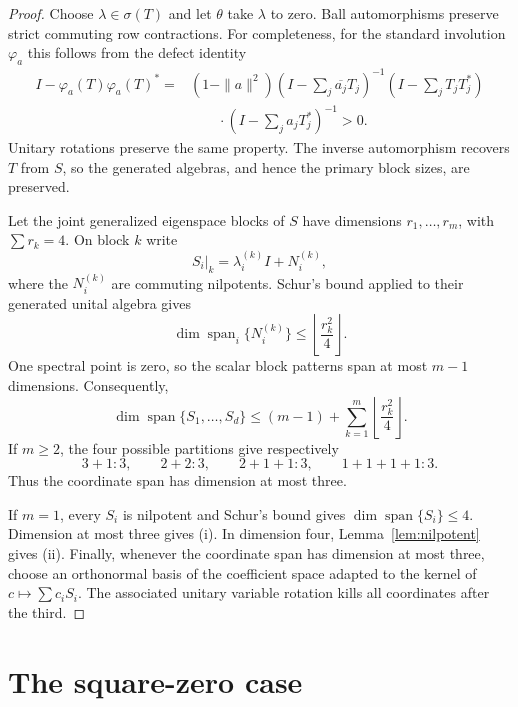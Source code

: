 \documentclass[11pt]{article}
\theoremstyle{remark}
\newcommand{\Span}{\operatorname{span}}
\begin{document}
\begin{proof}
Choose $\lambda\in\sigma(T)$ and let $\theta$ take $\lambda$ to zero.  Ball
automorphisms preserve strict commuting row contractions.  For completeness,
for the standard involution $\varphi_a$ this follows from the defect identity
\begin{equation}\label{eq:defect}
\begin{aligned}
 I-\varphi_a(T)\varphi_a(T)^*
  ={}&(1-\|a\|^2)
  \left(I-\sum_j\overline{a_j}T_j\right)^{-1}
  \left(I-\sum_jT_jT_j^*\right)\\
  &\qquad\cdot
  \left(I-\sum_j a_jT_j^*\right)^{-1}>0.
\end{aligned}
\end{equation}
Unitary rotations preserve the same property.  The inverse automorphism
recovers $T$ from $S$, so the generated algebras, and hence the primary block
sizes, are preserved.

Let the joint generalized eigenspace blocks of $S$ have dimensions
$r_1,\ldots,r_m$, with $\sum r_k=4$.  On block $k$ write
\[
 S_i|_k=\lambda_i^{(k)}I+N_i^{(k)},
\]
where the $N_i^{(k)}$ are commuting nilpotents.  Schur's bound applied to
their generated unital algebra gives
\begin{equation}\label{eq:block-bound}
 \dim\Span_i\{N_i^{(k)}\}\leq\left\lfloor\frac{r_k^2}{4}\right\rfloor.
\end{equation}
One spectral point is zero, so the scalar block patterns span at most
$m-1$ dimensions.  Consequently,
\begin{equation}\label{eq:rank-bound}
 \dim\Span\{S_1,\ldots,S_d\}
 \leq (m-1)+\sum_{k=1}^m\left\lfloor\frac{r_k^2}{4}\right\rfloor.
\end{equation}
If $m\geq2$, the four possible partitions give respectively
\[
3+1:3,\qquad 2+2:3,\qquad 2+1+1:3,\qquad 1+1+1+1:3.
\]
Thus the coordinate span has dimension at most three.

If $m=1$, every $S_i$ is nilpotent and Schur's bound gives
$\dim\Span\{S_i\}\leq4$.  Dimension at most three gives (i).  In dimension
four, Lemma~\ref{lem:nilpotent} gives (ii).  Finally, whenever the coordinate
span has dimension at most three, choose an orthonormal basis of the
coefficient space adapted to the kernel of
$c\mapsto\sum c_iS_i$.  The associated unitary variable rotation kills all
coordinates after the third.
\end{proof}

\section{The square-zero case}
\end{document}

